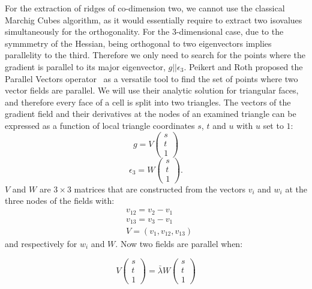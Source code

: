 For the extraction of ridges of co-dimension two, we cannot use the
classical Marchig Cubes algorithm, as it would essentially require to
extract two isovalues simultaneously for the orthogonality. For the
3-dimensional case, due to the symmmetry of the Hessian, being
orthogonal to two eigenvectors implies parallelity to the third.
Therefore we only need to search for the points where the gradient is
parallel to its major eigenvector, $g||\epsilon_3$. Peikert and Roth
proposed the Parallel Vectors operator~\cite{PV} as a versatile tool to
find the set of points where two vector fields are parallel. We will use
their analytic solution for triangular faces, and therefore every face
of a cell is split into two triangles. The vectors of the gradient field
and their derivatives at the nodes of an examined triangle can be
expressed as a function of local triangle coordinates $s$, $t$ and $u$
with $u$ set to $1$:
\begin{equation}
  g = V
  \begin{pmatrix}
    s\\
    t\\
    1
  \end{pmatrix}
\end{equation}
\begin{equation}
  \epsilon_3 = W
  \begin{pmatrix}
    s\\
    t\\
    1
  \end{pmatrix}.
\end{equation}
\noindent $V$ and $W$ are $3 \times 3$ matrices that are constructed
from the vectors $v_i$ and $w_i$ at the three nodes of the fields with:
\begin{align}
  &v_{12} = v_2 - v_1\\
  &v_{13} = v_3 - v_1\\
  &V = (v_1, v_{12}, v_{13})
\end{align}
\noindent and respectively for $w_i$ and $W$. Now two fields are
parallel when:

\begin{equation}
  V
  \begin{pmatrix}
    s\\
    t\\
    1
  \end{pmatrix}
  = \bar{\lambda} W
  \begin{pmatrix}
    s\\
    t\\
    1
  \end{pmatrix}
\end{equation}


